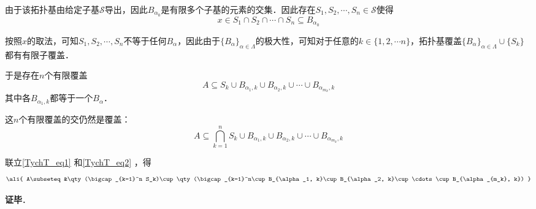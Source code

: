 由于该拓扑基由给定子基$\mathcal{S}$导出，因此$B_{\alpha_0}$是有限多个子基的元素的交集．因此存在$S_1, S_2, \cdots, S_n\in\mathcal{S}$使得
\begin{equation}\label{TychT_eq1}
x\in S_1\cap S_2\cap\cdots\cap S_n \subseteq B_{\alpha_0}
\end{equation}

按照$x$的取法，可知$S_1, S_2, \cdots, S_n$不等于任何$B_\alpha$，因此由于$\{B_\alpha\}_{\alpha\in\Lambda}$的极大性，可知对于任意的$k\in\{1, 2, \cdots n\}$，拓扑基覆盖$\{B_\alpha\}_{\alpha\in\Lambda}\cup \{S_k\}$都有有限子覆盖．

于是存在$n$个有限覆盖
\begin{equation}
A\subseteq S_k\cup B_{\alpha_1, k}\cup B_{\alpha_2, k}\cup\cdots\cup B_{\alpha_{m_k}, k}
\end{equation}
其中各$B_{\alpha_1, k}$都等于一个$B_\alpha$．

这$n$个有限覆盖的交仍然是覆盖：
\begin{equation}\label{TychT_eq2}
A\subseteq \bigcap_{k=1}^n S_k\cup B_{\alpha_1, k}\cup B_{\alpha_2, k}\cup\cdots\cup B_{\alpha_{m_k}, k}
\end{equation}

联立\autoref{TychT_eq1} 和\autoref{TychT_eq2} ，得
\begin{equation}
\ali{
    A\subseteq &\qty(\bigcap_{k=1}^n S_k)\cup\qty(\bigcap_{k=1}^n\cup B_{\alpha_1, k}\cup B_{\alpha_2, k}\cup\cdots\cup B_{\alpha_{m_k}, k})
}
\end{equation}











\textbf{证毕}．























